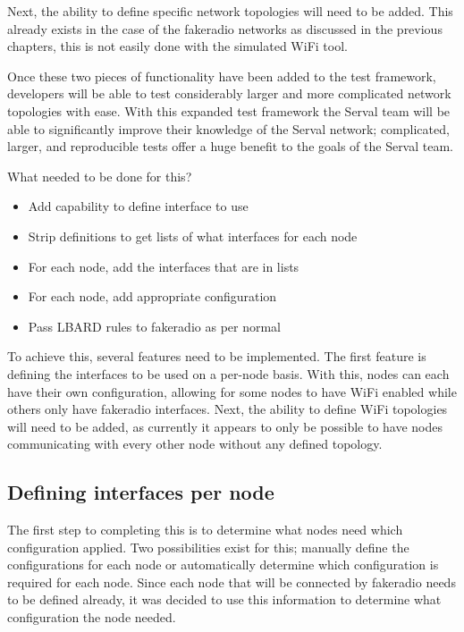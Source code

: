 Next, the ability to define specific network topologies will need to be added.
This already exists in the case of the fakeradio networks as discussed in the previous chapters, this is not easily done with the simulated WiFi tool.

Once these two pieces of functionality have been added to the test framework, developers will be able to test considerably larger and more complicated network topologies with ease.
With this expanded test framework the Serval team will be able to significantly improve their knowledge of the Serval network; complicated, larger, and reproducible tests offer a huge benefit to the goals of the Serval team. 

What needed to be done for this?
\begin{itemize}
    \item Add capability to define interface to use
    \item Strip definitions to get lists of what interfaces for each node
    \item For each node, add the interfaces that are in lists
    \item For each node, add appropriate configuration
    \item Pass LBARD rules to fakeradio as per normal
\end{itemize}


To achieve this, several features need to be implemented. 
The first feature is defining the interfaces to be used on a per-node basis.
With this, nodes can each have their own configuration, allowing for some nodes to have WiFi enabled while others only have fakeradio interfaces.
Next, the ability to define WiFi topologies will need to be added, as currently it appears to only be possible to have nodes communicating with every other node without any defined topology.

\subsection{Defining interfaces per node}

The first step to completing this is to determine what nodes need which configuration applied.
Two possibilities exist for this; manually define the configurations for each node or automatically determine which configuration is required for each node.
Since each node that will be connected by fakeradio needs to be defined already, it was decided to use this information to determine what configuration the node needed.


